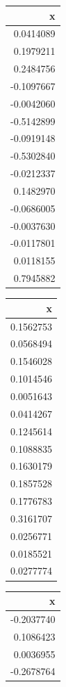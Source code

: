 \documentclass[10pt,dvipsnames,enabledeprecatedfontcommands]{scrartcl}
\begin{document}
\begin{table}

\centering
\begin{tabular}[t]{r}
\hline
x\\
\hline
0.0414089\\
\hline
0.1979211\\
\hline
0.2484756\\
\hline
-0.1097667\\
\hline
-0.0042060\\
\hline
-0.5142899\\
\hline
-0.0919148\\
\hline
-0.5302840\\
\hline
-0.0212337\\
\hline
0.1482970\\
\hline
-0.0686005\\
\hline
-0.0037630\\
\hline
-0.0117801\\
\hline
0.0118155\\
\hline
0.7945882\\
\hline
\end{tabular}
\centering
\begin{tabular}[t]{r}
\hline
x\\
\hline
0.1562753\\
\hline
0.0568494\\
\hline
0.1546028\\
\hline
0.1014546\\
\hline
0.0051643\\
\hline
0.0414267\\
\hline
0.1245614\\
\hline
0.1088835\\
\hline
0.1630179\\
\hline
0.1857528\\
\hline
0.1776783\\
\hline
0.3161707\\
\hline
0.0256771\\
\hline
0.0185521\\
\hline
0.0277774\\
\hline
\end{tabular}
\centering
\begin{tabular}[t]{r}
\hline
x\\
\hline
-0.2037740\\
\hline
0.1086423\\
\hline
0.0036955\\
\hline
-0.2678764\\

\end{tabular}
\end{table}
\end{document}
